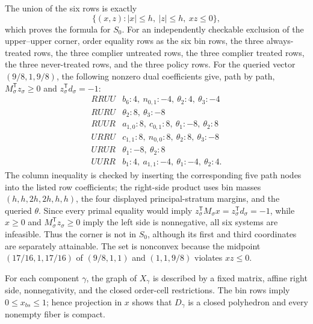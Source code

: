 The union of the six rows is exactly
\[
\{(x,z):|x|\le h,\ |z|\le h,\ xz\le0\},
\]
which proves the formula for \(S_0\).  For an independently checkable exclusion of the upper--upper corner, order equality rows as the six bin rows, the three always-treated rows, the three complier untreated rows, the three complier treated rows, the three never-treated rows, and the three policy rows.  For the queried vector \((9/8,1,9/8)\), the following nonzero dual coefficients give, path by path, \(M_\sigma^{\mathsf T}z_\sigma\ge0\) and \(z_\sigma^{\mathsf T}d_\sigma=-1\):
\[
\begin{array}{c|l}
RRUU&b_6:4,\ n_{0,1}:-4,\ \theta_2:4,\ \theta_3:-4\\
RURU&\theta_2:8,\ \theta_3:-8\\
RUUR&a_{1,0}:8,\ c_{0,1}:8,\ \theta_1:-8,\ \theta_2:8\\
URRU&c_{1,1}:8,\ n_{0,0}:8,\ \theta_2:8,\ \theta_3:-8\\
URUR&\theta_1:-8,\ \theta_2:8\\
UURR&b_1:4,\ a_{1,1}:-4,\ \theta_1:-4,\ \theta_2:4.
\end{array}
\]
The column inequality is checked by inserting the corresponding five path nodes into the listed row coefficients; the right-side product uses bin masses \((h,h,2h,2h,h,h)\), the four displayed principal-stratum margins, and the queried \(\theta\).  Since every primal equality would imply \(z_\sigma^{\mathsf T}M_\sigma x=z_\sigma^{\mathsf T}d_\sigma=-1\), while \(x\ge0\) and \(M_\sigma^{\mathsf T}z_\sigma\ge0\) imply the left side is nonnegative, all six systems are infeasible.  Thus the corner is not in \(S_0\), although its first and third coordinates are separately attainable.  The set is nonconvex because the midpoint \((17/16,1,17/16)\) of \((9/8,1,1)\) and \((1,1,9/8)\) violates \(xz\le0\).

For each component \(\gamma\), the graph of \(X_\gamma\) is described by a fixed matrix, affine right side, nonnegativity, and the closed order-cell restrictions.  The bin rows imply \(0\le x_{bs}\le1\); hence projection in \(x\) shows that \(D_\gamma\) is a closed polyhedron and every nonempty fiber is compact.

